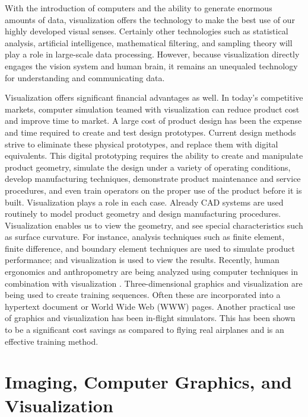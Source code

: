 With the introduction of computers and the ability to generate enormous amounts of data, visualization offers the technology to make the best use of our highly developed visual senses. Certainly other technologies such as statistical analysis, artificial intelligence, mathematical filtering, and sampling theory will play a role in large-scale data processing. However, because visualization directly engages the vision system and human brain, it remains an unequaled technology for understanding and communicating data.

Visualization offers significant financial advantages as well. In today's competitive markets, computer simulation teamed with visualization can reduce product cost and improve time to market. A large cost of product design has been the expense and time required to create and test design prototypes. Current design methods strive to eliminate these physical prototypes, and replace them with digital equivalents. This digital prototyping requires the ability to create and manipulate product geometry, simulate the design under a variety of operating conditions, develop manufacturing techniques, demonstrate product maintenance and service procedures, and even train operators on the proper use of the product before it is built. Visualization plays a role in each case. Already CAD systems are used routinely to model product geometry and design manufacturing procedures. Visualization enables us to view the geometry, and see special characteristics such as surface curvature. For instance, analysis techniques such as finite element, finite difference, and boundary element techniques are used to simulate product performance; and visualization is used to view the results. Recently, human ergonomics and anthropometry are being analyzed using computer techniques in combination with visualization \cite{MDHMS}. Three-dimensional graphics and visualization are being used to create training sequences. Often these are incorporated into a hypertext document or World Wide Web (WWW) pages. Another practical use of graphics and visualization has been in-flight simulators. This has been shown to be a significant cost savings as compared to flying real airplanes and is an effective training method.

\section{Imaging, Computer Graphics, and Visualization}
\label{sec:imaging_computer_graphics_visualization}

